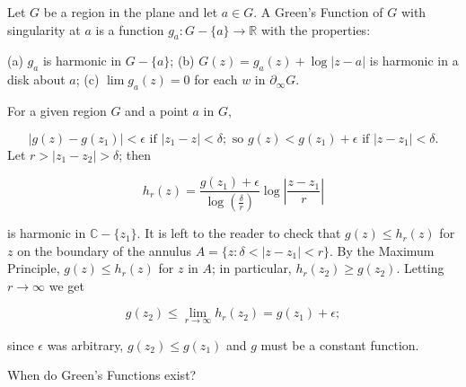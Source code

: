Let $G$ be a region in the plane and let $a \in G$. A Green’s Function of $G$ with singularity at $a$ is a function $g_a: G - \{a\} \to \mathbb{R}$ with the properties:

(a) $g_a$ is harmonic in $G - \{a\}$;
(b) $G(z) = g_a(z) + \log |z-a|$ is harmonic in a disk about $a$;
(c) $\lim g_a(z) = 0$ for each $w$ in $\partial_\infty G$.

For a given region $G$ and a point $a$ in $G$,

$$|g(z) - g(z_1)| < \epsilon \text{ if } |z_1 - z| < \delta; \text{ so } g(z) < g(z_1) + \epsilon \text{ if } |z - z_1| < \delta.$$ Let $r > |z_1 - z_2| > \delta$; then

$$h_r(z) = \frac{g(z_1) + \epsilon}{\log \left( \frac{\delta}{r} \right)} \log \left| \frac{z - z_1}{r} \right|$$

is harmonic in $\mathbb{C} - \{z_1\}$. It is left to the reader to check that $g(z) \leq h_r(z)$ for $z$ on the boundary of the annulus $A = \{z : \delta < |z - z_1| < r\}$. By the Maximum Principle, $g(z) \leq h_r(z)$ for $z$ in $A$; in particular, $h_r(z_2) \geq g(z_2)$. Letting $r \to \infty$ we get

$$g(z_2) \leq \lim_{r \to \infty} h_r(z_2) = g(z_1) + \epsilon;$$

since $\epsilon$ was arbitrary, $g(z_2) \leq g(z_1)$ and $g$ must be a constant function.

When do Green's Functions exist?